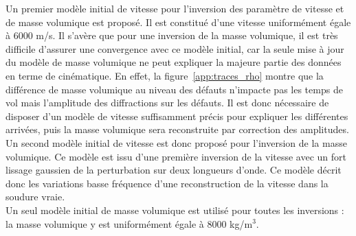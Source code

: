 Un premier modèle initial de vitesse pour l'inversion des paramètre de vitesse et de masse volumique est proposé. Il est constitué d'une vitesse uniformément égale à 6000 m/s. Il s'avère que pour une inversion de la masse volumique, il est très difficile d'assurer une convergence avec ce modèle initial, car la seule mise à jour du modèle de masse volumique ne peut expliquer la majeure partie des données en terme de cinématique. En effet, la figure~\ref{app:traces_rho} montre que la différence de masse volumique au niveau des défauts n'impacte pas les temps de vol mais l'amplitude des diffractions sur les défauts. Il est donc nécessaire de disposer d'un modèle de vitesse suffisamment précis pour expliquer les différentes arrivées, puis la masse volumique sera reconstruite par correction des amplitudes. \\

Un second modèle initial de vitesse est donc proposé pour l'inversion de la masse volumique. Ce modèle est issu d'une première inversion de la vitesse avec un fort lissage gaussien de la perturbation sur deux longueurs d'onde. Ce modèle décrit donc les variations basse fréquence d'une reconstruction de la vitesse dans la soudure vraie.\\

Un seul modèle initial de masse volumique est utilisé pour toutes les inversions : la masse volumique y est uniformément égale à 8000 kg/m$^{3}$.

